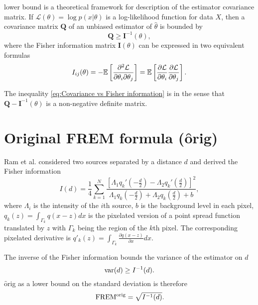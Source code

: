 \CR lower bound is a theoretical framework for description of the estimator covariance matrix. If $\mathcal{L}(\theta)=\log p(x|\theta)$ is a log-likelihood function for data $X$, then a covariance matrix $\bm{Q}$ of an unbiased estimator of $\hat{\theta}$ is bounded by \cite{Rao1945,Cover1991} 
%
\begin{equation}
	\bm{Q}\geq\bm{I}^{-1}(\theta),
	\label{eq:Covariance vs Fisher information}
\end{equation}
%
where the Fisher information matrix $\bm{I}(\theta)$ can be expressed in two equivalent formulas
%
\begin{equation}
	I_{ij}(\theta)=-\mathbb{E}\left[\frac{\partial^2\mathcal{L}}{\partial\theta_i\partial\theta_j}\right]=\mathbb{E}\left[\frac{\partial\mathcal{L}}{\partial\theta_i}\frac{\partial\mathcal{L}}{\partial\theta_j}\right].
	\label{eq:Fisher information general}
\end{equation}

The inequality \autoref{eq:Covariance vs Fisher information} is in the sense that $\bm{Q}-\bm{I}^{-1}(\theta)$ is a non-negative definite matrix.

\section{Original FREM formula (\f{orig})\label{sec:FREM orig}}

Ram et al. \cite{Ram2006} considered two sources separated by a distance $d$ and derived the Fisher information
%
\begin{equation}
	I(d)=\frac{1}{4}\sum_{k=1}^N\frac{\left[\Lambda_1q_k'(-\frac{d}{2})-\Lambda_2q_k'(\frac{d}{2})\right]^2}{\Lambda_1q_k(-\frac{d}{2})+\Lambda_2q_k(\frac{d}{2})+b},
	\label{eq:Ram FREM}
\end{equation}
%
where $\Lambda_i$ is the intensity of the $i$th source, $b$ is the background level in each pixel, $q_k(z)=\int_{\Gamma_k}q(x-z)dx$ is the pixelated version of a point spread function translated by $z$ with $\Gamma_k$ being the region of the $k$th pixel. The corresponding pixelated derivative is $q'_k(z)=\int_{\Gamma_k}\frac{\partial q(x-z)}{\partial x}dx$. 

The inverse of the Fisher information bounds the variance of the estimator on $d$ 
%
\begin{equation}
	\mathrm{var}(d)\geq I^{-1}(d).
\end{equation}
%
\f{orig} as a lower bound on the standard deviation is therefore
%
\begin{equation}
	\, \mathrm{FREM^{\textrm{orig}}}=\sqrt{I^{-1}(d)}.
	\label{eq:FREM}	
\end{equation}

